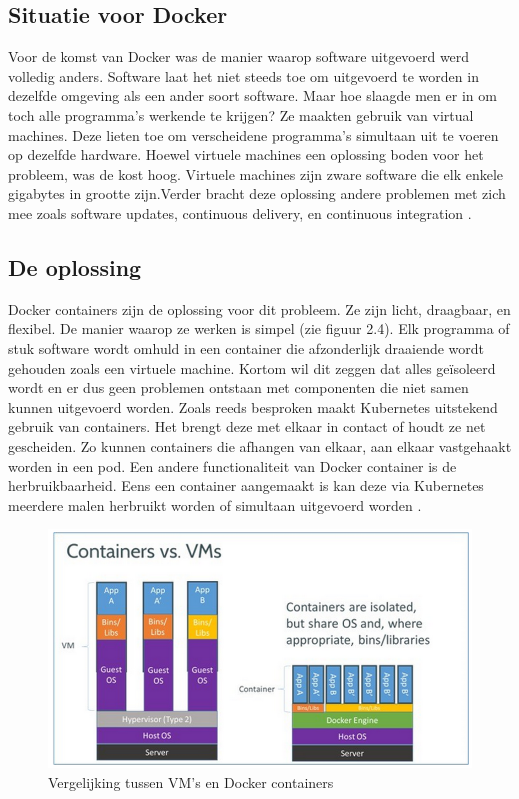 \subsection{Situatie voor Docker}
Voor de komst van Docker was de manier waarop software uitgevoerd werd volledig anders. Software laat het niet steeds toe om uitgevoerd te worden in dezelfde omgeving als een ander soort software. Maar hoe slaagde men er in om toch alle programma's werkende te krijgen? Ze maakten gebruik van virtual machines. Deze lieten toe om verscheidene programma's simultaan uit te voeren op dezelfde hardware. Hoewel virtuele machines een oplossing boden voor het probleem, was de kost hoog. Virtuele machines zijn zware software die elk enkele gigabytes in grootte zijn.Verder bracht deze oplossing andere problemen met zich mee  zoals software updates, continuous delivery, en continuous integration \autocite{yegulalp2018}.

\subsection{De oplossing}
Docker containers zijn de oplossing voor dit probleem. Ze zijn licht, draagbaar, en flexibel. De manier waarop ze werken is simpel (zie figuur 2.4). Elk programma of stuk software wordt omhuld in een container die afzonderlijk draaiende wordt gehouden zoals een virtuele machine. Kortom wil dit zeggen dat alles geïsoleerd wordt en er dus geen problemen ontstaan met componenten die niet samen kunnen uitgevoerd worden. Zoals reeds besproken maakt Kubernetes uitstekend gebruik van containers. Het brengt deze met elkaar in contact of houdt ze net gescheiden. Zo kunnen containers die afhangen van elkaar, aan elkaar vastgehaakt worden in een pod. Een andere functionaliteit van Docker container is de herbruikbaarheid. Eens een container aangemaakt is kan deze via Kubernetes meerdere malen herbruikt worden of simultaan uitgevoerd worden \autocite{yegulalp2018}.

\begin{figure}[ht]
    \centering
    \includegraphics[scale=0.6]{img/docker-vm-vergelijking}
    \caption[Vergelijking tussen VM's en Docker containers]{Vergelijking tussen VM's en Docker containers \cite{vaughan2018}}
\end{figure}


